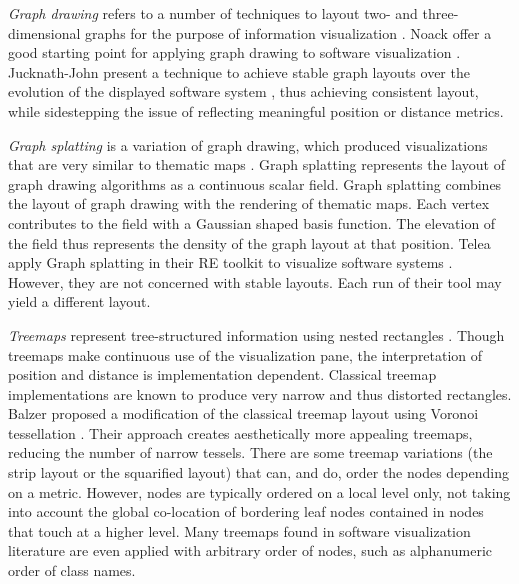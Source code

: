 \emph{Graph drawing} refers to a number of techniques to layout two- and three-dimensional graphs for the purpose of information visualization \cite{Ware00a,Kauf01b}. Noack \etal offer a good starting point for applying graph drawing to software visualization \cite{Noac05a}. Jucknath-John \etal present a technique to achieve stable graph layouts over the evolution of the displayed software system \cite{Juck06a}, thus achieving consistent layout, while sidestepping the issue of reflecting meaningful position or distance metrics.


\emph{Graph splatting} is a variation of graph drawing, which produced visualizations that are very similar to thematic maps \cite{Lier03a}. Graph splatting represents the layout of graph drawing algorithms as a continuous scalar field. Graph splatting combines the layout of graph drawing with the rendering of thematic maps. Each vertex contributes to the field with a Gaussian shaped basis function. The elevation of the field thus represents the density of the graph layout at that position. Telea \etal apply Graph splatting in their RE toolkit to visualize software systems \cite{Tele03a}. However, they are not concerned with stable layouts. Each run of their tool may yield a different layout.

\emph{Treemaps} represent tree-structured information using nested rectangles \cite{Ware00a}.
Though treemaps make continuous use of the visualization pane, the interpretation of position and distance is implementation dependent. Classical treemap implementations are known to produce very narrow and thus distorted rectangles. Balzer \etal proposed a modification of the classical treemap layout using Voronoi tessellation \cite{Balz05a}. Their approach creates aesthetically more appealing treemaps, reducing the number of narrow tessels. There are some treemap variations (\eg the strip layout or the squarified layout) that can, and do, order the nodes depending on a metric. However, nodes are typically ordered on a local level only, not taking into account the global co-location of bordering leaf nodes contained in nodes that touch at a higher level. Many treemaps found in software visualization literature are even applied with arbitrary order of nodes, such as alphanumeric order of class names. 

